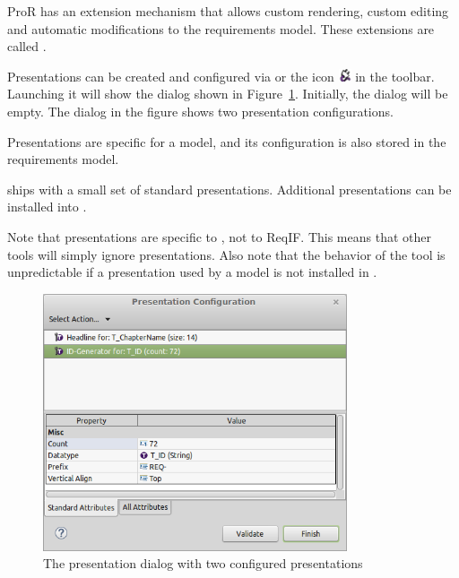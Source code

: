 % 

ProR has an extension mechanism that allows custom rendering, custom editing and automatic modifications to the requirements model. These extensions are called .

Presentations can be created and configured via  or the icon \includegraphics[height=1em]{../rmf-images/icons/full/obj16//ReqIFToolExtension.png} in the toolbar.  Launching it will show the dialog shown in Figure~\ref{fig:presentation-dialog}.  Initially, the dialog will be empty.  The dialog in the figure shows two presentation configurations.

Presentations are specific for a model, and its configuration is also stored in the requirements model.

\pror{} ships with a small set of standard presentations.  Additional presentations can be installed into \pror{}.

\begin{warning}
Note that presentations are specific to \pror{}, not to ReqIF.  This means that other tools will simply ignore presentations.  Also note that the behavior of the tool is unpredictable if a presentation used by a model is not installed in \pror{}.
\end{warning}

\begin{figure}
  \centering
  \includegraphics[width=0.8\textwidth]{../rmf-images/presentation-dialog.png}
  \caption{The presentation dialog with two configured presentations}
  \label{fig:presentation-dialog}
\end{figure}

